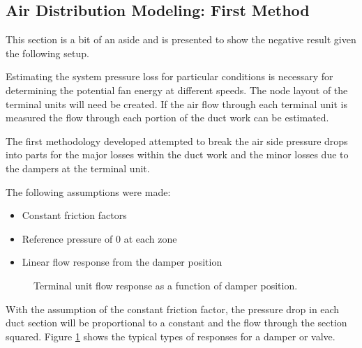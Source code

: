 \subsection{Air Distribution Modeling: First Method}
This section is a bit of an aside and is presented to show the negative
result given the following setup.

Estimating the system pressure loss for particular conditions is
necessary for determining the potential fan energy at different speeds.
The node layout of the terminal units will need be created. If the air
flow through each terminal unit is measured the flow through each
portion of the duct work can be estimated.

The first methodology developed attempted to break the air side pressure
drops into parts for the major losses within the duct work and the minor
losses due to the dampers at the terminal unit.

The following assumptions were made:

\begin{itemize}
    \item Constant friction factors
    \item Reference pressure of 0 at each zone
    \item Linear flow response from the damper position
\end{itemize}


\begin{figure}
\centering
{}
\caption{Terminal unit flow response as a function of damper position.}
\label{fig:flowVersusDamperPos}
\end{figure}



With the assumption of the constant friction factor, the pressure drop
in each duct section will be proportional to a constant and the flow
through the section squared. Figure \ref{fig:flowVersusDamperPos} shows
the typical types of responses for a damper or valve.


